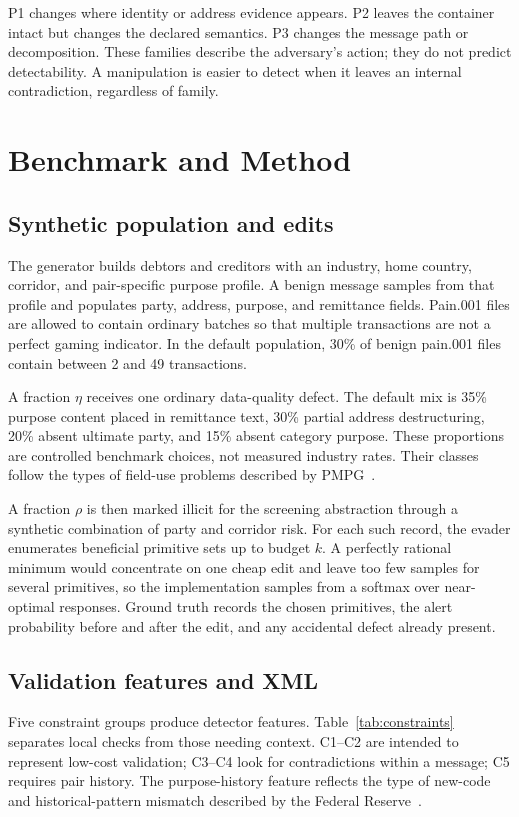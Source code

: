 \documentclass[conference]{IEEEtran}
\begin{document}
P1 changes where identity or address evidence appears. P2 leaves the container
intact but changes the declared semantics. P3 changes the message path or
decomposition. These families describe the adversary's action; they do not
predict detectability. A manipulation is easier to detect when it leaves an
internal contradiction, regardless of family.

\section{Benchmark and Method}
\subsection{Synthetic population and edits}
The generator builds debtors and creditors with an industry, home country,
corridor, and pair-specific purpose profile. A benign message samples from
that profile and populates party, address, purpose, and remittance fields.
Pain.001 files are allowed to contain ordinary batches so that multiple
transactions are not a perfect gaming indicator. In the default population,
30\% of benign pain.001 files contain between 2 and 49 transactions.

A fraction $\eta$ receives one ordinary data-quality defect. The default mix
is 35\% purpose content placed in remittance text, 30\% partial address
destructuring, 20\% absent ultimate party, and 15\% absent category purpose.
These proportions are controlled benchmark choices, not measured industry
rates. Their classes follow the types of field-use problems described by
PMPG~\cite{pmpg2024}.

A fraction $\rho$ is then marked illicit for the screening abstraction through
a synthetic combination of party and corridor risk. For each such record, the
evader enumerates beneficial primitive sets up to budget $k$. A perfectly
rational minimum would concentrate on one cheap edit and leave too few samples
for several primitives, so the implementation samples from a softmax over
near-optimal responses. Ground truth records the chosen primitives, the alert
probability before and after the edit, and any accidental defect already
present.

\subsection{Validation features and XML}
Five constraint groups produce detector features. Table~\ref{tab:constraints}
separates local checks from those needing context. C1--C2 are intended to
represent low-cost validation; C3--C4 look for contradictions within a
message; C5 requires pair history. The purpose-history feature reflects the
type of new-code and historical-pattern mismatch described by the Federal
Reserve~\cite{frb2026}.
\end{document}
